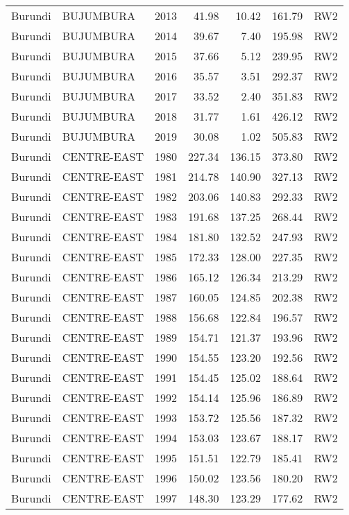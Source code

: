 \begin{longtable}{lllrrrl}
  Burundi & BUJUMBURA & 2013 & 41.98 & 10.42 & 161.79 & RW2 \\ 
  Burundi & BUJUMBURA & 2014 & 39.67 & 7.40 & 195.98 & RW2 \\ 
  Burundi & BUJUMBURA & 2015 & 37.66 & 5.12 & 239.95 & RW2 \\ 
  Burundi & BUJUMBURA & 2016 & 35.57 & 3.51 & 292.37 & RW2 \\ 
  Burundi & BUJUMBURA & 2017 & 33.52 & 2.40 & 351.83 & RW2 \\ 
  Burundi & BUJUMBURA & 2018 & 31.77 & 1.61 & 426.12 & RW2 \\ 
  Burundi & BUJUMBURA & 2019 & 30.08 & 1.02 & 505.83 & RW2 \\ 
  Burundi & CENTRE-EAST & 1980 & 227.34 & 136.15 & 373.80 & RW2 \\ 
  Burundi & CENTRE-EAST & 1981 & 214.78 & 140.90 & 327.13 & RW2 \\ 
  Burundi & CENTRE-EAST & 1982 & 203.06 & 140.83 & 292.33 & RW2 \\ 
  Burundi & CENTRE-EAST & 1983 & 191.68 & 137.25 & 268.44 & RW2 \\ 
  Burundi & CENTRE-EAST & 1984 & 181.80 & 132.52 & 247.93 & RW2 \\ 
  Burundi & CENTRE-EAST & 1985 & 172.33 & 128.00 & 227.35 & RW2 \\ 
  Burundi & CENTRE-EAST & 1986 & 165.12 & 126.34 & 213.29 & RW2 \\ 
  Burundi & CENTRE-EAST & 1987 & 160.05 & 124.85 & 202.38 & RW2 \\ 
  Burundi & CENTRE-EAST & 1988 & 156.68 & 122.84 & 196.57 & RW2 \\ 
  Burundi & CENTRE-EAST & 1989 & 154.71 & 121.37 & 193.96 & RW2 \\ 
  Burundi & CENTRE-EAST & 1990 & 154.55 & 123.20 & 192.56 & RW2 \\ 
  Burundi & CENTRE-EAST & 1991 & 154.45 & 125.02 & 188.64 & RW2 \\ 
  Burundi & CENTRE-EAST & 1992 & 154.14 & 125.96 & 186.89 & RW2 \\ 
  Burundi & CENTRE-EAST & 1993 & 153.72 & 125.56 & 187.32 & RW2 \\ 
  Burundi & CENTRE-EAST & 1994 & 153.03 & 123.67 & 188.17 & RW2 \\ 
  Burundi & CENTRE-EAST & 1995 & 151.51 & 122.79 & 185.41 & RW2 \\ 
  Burundi & CENTRE-EAST & 1996 & 150.02 & 123.56 & 180.20 & RW2 \\ 
  Burundi & CENTRE-EAST & 1997 & 148.30 & 123.29 & 177.62 & RW2 \\ 

\end{longtable}
